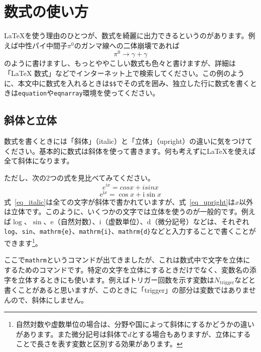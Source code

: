 \section{数式の使い方}

\LaTeX{}を使う理由のひとつが、数式を綺麗に出力できるというのがあります。例えば中性パイ中間子$\pi^0$のガンマ線への二体崩壊であれば
\begin{equation}
  \pi^0 \rightarrow \gamma + \gamma
\end{equation}
のように書けますし、もっとややこしい数式も色々と書けますが、詳細は「LaTeX 数式」などでインターネット上で検索してください。この例のように、本文中に数式を入れるときは\texttt{\$\$}でその式を囲み、独立した行に数式を書くときは\texttt{equation}や\texttt{eqnarray}環境を使ってください。

\subsection{斜体と立体}
数式を書くときには「斜体」（italic）と「立体」（upright）の違いに気をつけてください。基本的に数式は斜体を使って書きます。何も考えずに\LaTeX{}を使えば全て斜体になります。

ただし、次の2つの式を見比べてみてください。
\begin{equation}
  e^{ix}=cosx + isinx
  \label{eq_italic}
\end{equation}
\begin{equation}
  \mathrm{e}^{\mathrm{i}x}=\cos x + \mathrm{i}\sin x
  \label{eq_upright}
\end{equation}
式~\ref{eq_italic}は全ての文字が斜体で書かれていますが、式~\ref{eq_upright}は$x$以外は立体です。このように、いくつかの文字では立体を使うのが一般的です。例えば$\log$、$\sin$、$\mathrm{e}$（自然対数）、$\mathrm{i}$（虚数単位）、$\mathrm{d}$（微分記号）などは、それぞれ\texttt{log}、\texttt{sin}、\texttt{mathrm\{e\}}、\texttt{mathrm\{i\}}、\texttt{mathrm\{d\}}などと入力することで書くことができます\footnote{自然対数や虚数単位の場合は、分野や国によって斜体にするかどうかの違いがあります。また微分記号は斜体で$d$とする場合もありますが、立体にすることで長さを表す変数と区別する効果があります。}。

ここで\texttt{mathrm}というコマンドが出てきましたが、これは数式中で文字を立体にするためのコマンドです。特定の文字を立体にするときだけでなく、変数名の添字を立体するときにも使います。例えばトリガー回数を示す変数は$N_\mathrm{trigger}$などと書くことがあると思いますが、このときに「trigger」の部分は変数ではありませんので、斜体にしません。

